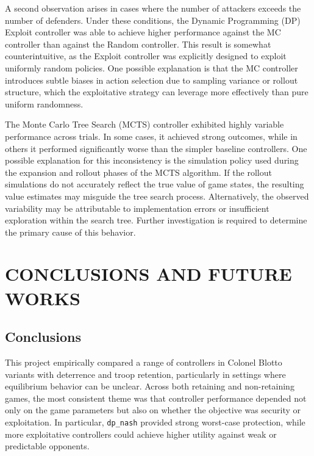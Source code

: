 \documentclass[letterpaper, 10 pt, conference]{ieeeconf}  %
\begin{document}
A second observation arises in cases where the number of attackers exceeds the number of defenders. Under these conditions, the Dynamic Programming (DP) Exploit controller was able to achieve higher performance against the MC controller than against the Random controller. This result is somewhat counterintuitive, as the Exploit controller was explicitly designed to exploit uniformly random policies. One possible explanation is that the MC controller introduces subtle biases in action selection due to sampling variance or rollout structure, which the exploitative strategy can leverage more effectively than pure uniform randomness.

The Monte Carlo Tree Search (MCTS) controller exhibited highly variable performance across trials. In some cases, it achieved strong outcomes, while in others it performed significantly worse than the simpler baseline controllers. One possible explanation for this inconsistency is the simulation policy used during the expansion and rollout phases of the MCTS algorithm. If the rollout simulations do not accurately reflect the true value of game states, the resulting value estimates may misguide the tree search process. Alternatively, the observed variability may be attributable to implementation errors or insufficient exploration within the search tree. Further investigation is required to determine the primary cause of this behavior.

\section{CONCLUSIONS AND FUTURE WORKS}

\subsection{Conclusions}

This project empirically compared a range of controllers in Colonel Blotto variants with deterrence and troop retention, particularly in settings where equilibrium behavior can be unclear. Across both retaining and non-retaining games, the most consistent theme was that controller performance depended not only on the game parameters but also on whether the objective was security or exploitation. In particular, \texttt{dp\_nash} provided strong worst-case protection, while more exploitative controllers could achieve higher utility against weak or predictable opponents.
\end{document}
